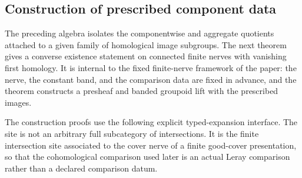 \subsection{Construction of prescribed component data}

The preceding algebra isolates the componentwise and aggregate quotients attached to a given family of homological image subgroups. The next theorem gives a converse existence statement on connected finite nerves with vanishing first homology. It is internal to the fixed finite-nerve framework of the paper: the nerve, the constant band, and the comparison data are fixed in advance, and the theorem constructs a presheaf and banded groupoid lift with the prescribed images.

The construction proofs use the following explicit typed-expansion
interface. The site is not an arbitrary full subcategory of intersections.
It is the finite intersection site associated to the cover nerve of a finite good-cover presentation, so that
the cohomological comparison used later is an actual Leray comparison rather
than a declared comparison datum.


